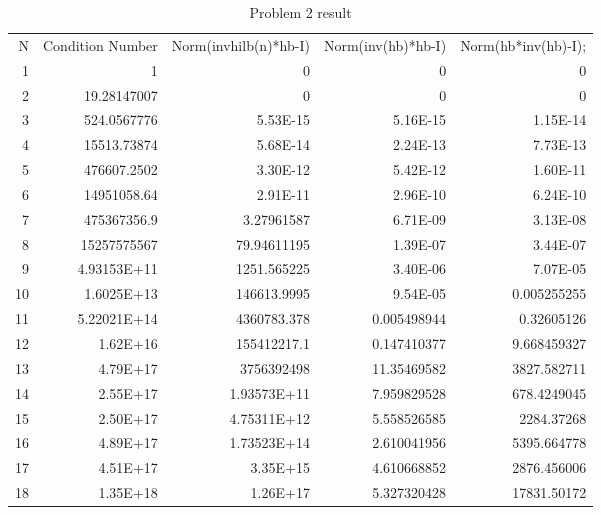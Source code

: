 \documentclass[12pt]{article}
\begin{document}
\begin{enumerate}
  \begin{landscape}
  \begin{table}[htbp]
    \centering
    \small
    \caption{Problem 2 result}
      \begin{tabular}{rrlrr}
      N     & \multicolumn{1}{l}{Condition Number} & Norm(invhilb(n)*hb-I) & \multicolumn{1}{l}{Norm(inv(hb)*hb-I)} & \multicolumn{1}{l}{Norm(hb*inv(hb)-I);} \\
      1     & 1     & \multicolumn{1}{r}{0} & 0     & 0 \\
      2     & 19.28147007 & \multicolumn{1}{r}{0} & 0     & 0 \\
      3     & 524.0567776 & \multicolumn{1}{r}{5.53E-15} & 5.16E-15 & 1.15E-14 \\
      4     & 15513.73874 & \multicolumn{1}{r}{5.68E-14} & 2.24E-13 & 7.73E-13 \\
      5     & 476607.2502 & \multicolumn{1}{r}{3.30E-12} & 5.42E-12 & 1.60E-11 \\
      6     & 14951058.64 & \multicolumn{1}{r}{2.91E-11} & 2.96E-10 & 6.24E-10 \\
      7     & 475367356.9 & \multicolumn{1}{r}{3.27961587} & 6.71E-09 & 3.13E-08 \\
      8     & 15257575567 & \multicolumn{1}{r}{79.94611195} & 1.39E-07 & 3.44E-07 \\
      9     & 4.93153E+11 & \multicolumn{1}{r}{1251.565225} & 3.40E-06 & 7.07E-05 \\
      10    & 1.6025E+13 & \multicolumn{1}{r}{146613.9995} & 9.54E-05 & 0.005255255 \\
      11    & 5.22021E+14 & \multicolumn{1}{r}{4360783.378} & 0.005498944 & 0.32605126 \\
      12    & 1.62E+16 & \multicolumn{1}{r}{155412217.1} & 0.147410377 & 9.668459327 \\
      13    & 4.79E+17 & \multicolumn{1}{r}{3756392498} & 11.35469582 & 3827.582711 \\
      14    & 2.55E+17 & \multicolumn{1}{r}{1.93573E+11} & 7.959829528 & 678.4249045 \\
      15    & 2.50E+17 & \multicolumn{1}{r}{4.75311E+12} & 5.558526585 & 2284.37268 \\
      16    & 4.89E+17 & \multicolumn{1}{r}{1.73523E+14} & 2.610041956 & 5395.664778 \\
      17    & 4.51E+17 & \multicolumn{1}{r}{3.35E+15} & 4.610668852 & 2876.456006 \\
      18    & 1.35E+18 & \multicolumn{1}{r}{1.26E+17} & 5.327320428 & 17831.50172 \\

\end{tabular}
\end{table}
\end{landscape}
\end{enumerate}
\end{document}
